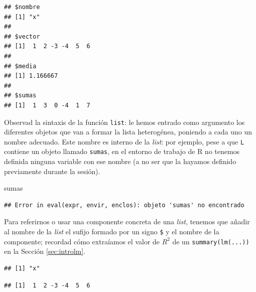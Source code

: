 \documentclass[]{book}
\newenvironment{Shaded}{\begin{snugshade}}{\end{snugshade}}
\newcommand{\NormalTok}[1]{#1}
\newcommand{\OperatorTok}[1]{\textcolor[rgb]{0.81,0.36,0.00}{\textbf{#1}}}
\theoremstyle{definition}
\theoremstyle{definition}
\theoremstyle{definition}
\theoremstyle{remark}
\begin{document}
\begin{verbatim}
## $nombre
## [1] "x"
## 
## $vector
## [1]  1  2 -3 -4  5  6
## 
## $media
## [1] 1.166667
## 
## $sumas
## [1]  1  3  0 -4  1  7
\end{verbatim}

Observad la sintaxis de la función \texttt{list}: le hemos entrado como argumento los diferentes objetos que van a formar la lista heterogénea, poniendo a cada uno un nombre adecuado. Este nombre es interno de la \emph{list}: por ejemplo, pese a que \texttt{L} contiene un objeto llamado \texttt{sumas}, en el entorno de trabajo de R no tenemos definida ninguna variable con ese nombre (a no ser que la hayamos definido previamente durante la sesión).

\begin{Shaded}
\begin{Highlighting}[]
\NormalTok{sumas}
\end{Highlighting}
\end{Shaded}

\begin{verbatim}
## Error in eval(expr, envir, enclos): objeto 'sumas' no encontrado
\end{verbatim}

Para referirnos o usar una componente concreta de una \emph{list}, tenemos que añadir al nombre de la \emph{list} el sufijo formado por un signo \texttt{\$} y el nombre de la componente; recordad cómo extraíamos el valor de \(R^2\) de un \texttt{summary(lm(...))} en la Sección \ref{sec:introlm}.

\begin{Shaded}
\end{Shaded}

\begin{verbatim}
## [1] "x"
\end{verbatim}

\begin{Shaded}
\end{Shaded}

\begin{verbatim}
## [1]  1  2 -3 -4  5  6
\end{verbatim}
\end{document}
